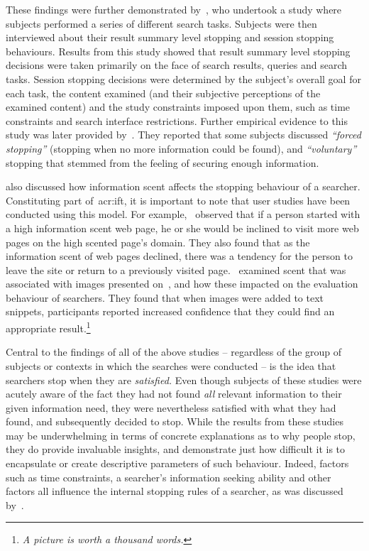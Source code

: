 These findings were further demonstrated by~\cite{wu2014information_scent}, who undertook a study where subjects performed a series of different search tasks. Subjects were then interviewed about their result summary level stopping and session stopping behaviours. Results from this study showed that result summary level stopping decisions were taken primarily on the face of search results, queries and search tasks. Session stopping decisions were determined by the subject's overall goal for each task, the content examined (and their subjective perceptions of the examined content) and the study constraints imposed upon them, such as time constraints and search interface restrictions. Further empirical evidence to this study was later provided by~\cite{wu2014stopping_query_abandonment}. They reported that some subjects discussed \emph{``forced stopping''} (stopping when no more information could be found), and \emph{``voluntary''} stopping that stemmed from the feeling of securing enough information.

\cite{wu2014information_scent} also discussed how information scent affects the stopping behaviour of a searcher. Constituting part of~\gls{acr:ift}, it is important to note that user studies have been conducted using this model. For example,~\cite{card2001scent_graphs} observed that if a person started with a high information scent web page, he or she would be inclined to visit more web pages on the high scented page's domain. They also found that as the information scent of web pages declined, there was a tendency for the person to leave the site or return to a previously visited page.~\cite{loumakis2011image_smells} examined scent that was associated with images presented on~, and how these impacted on the evaluation behaviour of searchers. They found that when images were added to text snippets, participants reported increased confidence that they could find an appropriate result.\footnote{\emph{A picture is worth a thousand words.}}

Central to the findings of all of the above studies -- regardless of the group of subjects or contexts in which the searches were conducted -- is the idea that searchers stop when they are \emph{satisfied.} Even though subjects of these studies were acutely aware of the fact they had not found \emph{all} relevant information to their given information need, they were nevertheless satisfied with what they had found, and subsequently decided to stop. While the results from these studies may be underwhelming in terms of concrete explanations as to why people stop, they do provide invaluable insights, and demonstrate just how difficult it is to encapsulate or create descriptive parameters of such behaviour. Indeed, factors such as time constraints, a searcher's information seeking ability and other factors all influence the internal stopping rules of a searcher, as was discussed by~\cite{marchionini1995information_seeking}. 

